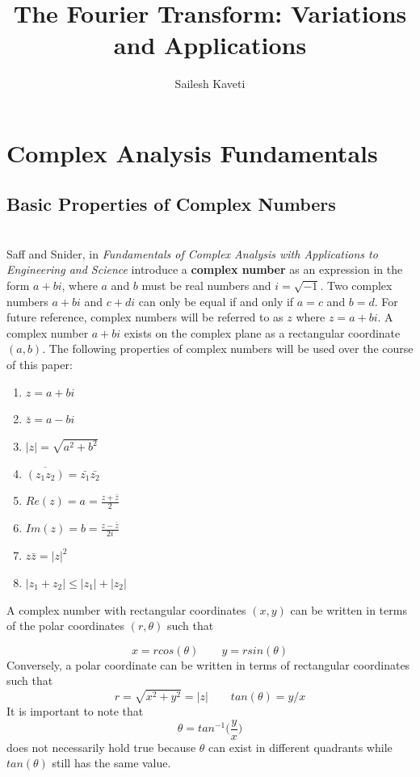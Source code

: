 \documentclass{amsproc}
\title{The Fourier Transform: Variations and Applications}
\author{Sailesh Kaveti}
\begin{document}
\maketitle


\tableofcontents
\newpage

\section{Complex Analysis Fundamentals}

\subsection{Basic Properties of Complex Numbers}

\mbox{}	 \\
\indent Saff and Snider, in \textit{Fundamentals of Complex Analysis with Applications to Engineering and Science} introduce a \textbf{complex number} as an expression in the form $a + bi$, where $a$ and $b$ must be real numbers and $i = \sqrt{-1}$. Two complex numbers $a +bi$ and $c + di$ can only be equal if and only if $a = c$ and $b = d$. For future reference, complex numbers will be referred to as $z$ where $z = a+bi$. A complex number $a+bi$ exists on the complex plane as a rectangular coordinate $(a, b)$. The following properties of complex numbers will be used over the course of this paper:

\begin{enumerate}
	\item $z = a+bi$
	\item $\bar{z} = a - bi$
	\item $|z| = \sqrt{a^2 + b^2}$
	\item $\overline{(z_1 z_2)} = \bar{z_1}\bar{z_2}$
	\item $Re(z) = a = \frac{z + \bar{z}}{2}$
	\item $Im(z) = b = \frac{z - \bar{z}}{2i}$
	\item $z \bar{z} = |z|^2$
	\item $|z_1 + z_2| \leq |z_1| + |z_2|$
\end{enumerate}

A complex number with rectangular coordinates $(x, y)$ can be written in terms of the polar coordinates $(r, \theta)$ such that

$$
x = rcos(\theta) \qquad y = rsin(\theta)
$$
Conversely, a polar coordinate can be written in terms of rectangular coordinates such that 
$$
r = \sqrt{x^2 + y^2} = |z| \qquad 
tan(\theta) = y/x
$$
It is important to note that 
$$
\theta = tan^{-1}\Big(\frac{y}{x}\Big)
$$
does not necessarily hold true because $\theta$ can exist in different quadrants while $tan(\theta)$ still has the same value.
\end{document}
